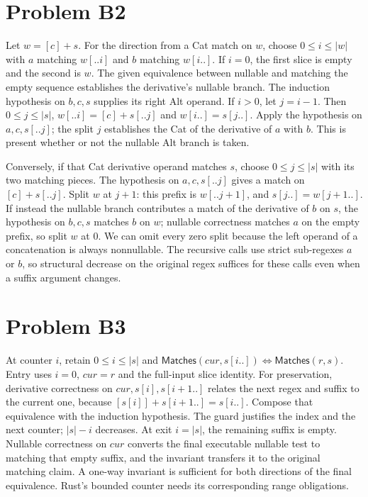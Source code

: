 \documentclass[11pt]{article}
\begin{document}
\section*{Problem B2}\label{ans:B2}
\begin{answer}
Let $w=[c]+s$. For the direction from a Cat match on $w$, choose
$0\leq i\leq |w|$ with $a$ matching $w[..i]$ and $b$ matching $w[i..]$.
If $i=0$, the first slice is empty and the second is $w$. The given equivalence
between nullable and matching the empty sequence establishes the derivative's
nullable branch. The induction hypothesis on $b,c,s$ supplies its right Alt
operand. If $i>0$, let $j=i-1$. Then $0\leq j\leq |s|$,
$w[..i]=[c]+s[..j]$ and $w[i..]=s[j..]$. Apply the hypothesis on $a,c,s[..j]$;
the split $j$ establishes the Cat of the derivative of $a$ with $b$. This is
present whether or not the nullable Alt branch is taken.

Conversely, if that Cat derivative operand matches $s$, choose
$0\leq j\leq |s|$ with its two matching pieces. The hypothesis on $a,c,s[..j]$
gives a match on $[c]+s[..j]$. Split $w$ at $j+1$: this prefix is
$w[..j+1]$, and $s[j..]=w[j+1..]$. If instead the nullable branch contributes
a match of the derivative of $b$ on $s$, the hypothesis on $b,c,s$ matches
$b$ on $w$; nullable correctness matches $a$ on the empty prefix, so split
$w$ at 0. We can omit every zero split because the left operand of a concatenation is always nonnullable.
The recursive calls use strict sub-regexes $a$ or $b$, so structural decrease
on the original regex suffices for these calls even when a suffix argument changes.
\end{answer}
\section*{Problem B3}\label{ans:B3}
\begin{answer}
At counter $i$, retain $0\leq i\leq |s|$ and
$\mathsf{Matches}(cur,s[i..])\Longleftrightarrow\mathsf{Matches}(r,s)$.
Entry uses $i=0$, $cur=r$ and the full-input slice identity. For preservation,
derivative correctness on $cur,s[i],s[i+1..]$ relates the next regex and suffix
to the current one, because $[s[i]]+s[i+1..]=s[i..]$. Compose that equivalence
with the induction hypothesis. The guard justifies the index and the next
counter; $|s|-i$ decreases. At exit $i=|s|$, the remaining suffix is empty.
Nullable correctness on $cur$ converts the final executable nullable test to
matching that empty suffix, and the invariant transfers it to the original
matching claim. A one-way invariant is sufficient for both directions of the final equivalence. Rust's bounded counter needs its corresponding range obligations.
\end{answer}
\end{document}
